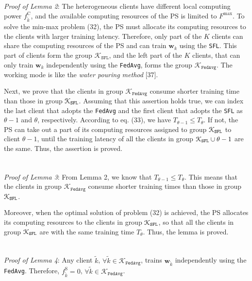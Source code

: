 \documentclass[10pt,journal,transmag]{IEEEtran}
\begin{document}
\begin{appendices}
\section{}
\label{appendix:proof of lemma 1}
\textit{Proof of Lemma 2}: The heterogeneous clients have different local computing power $f_{\tilde{k}}^\text{C}$, and the available computing resources of the PS is limited to $F^\text{max}$. To solve the min-max problem (32), the PS must allocate its computing resources to the clients with larger training latency. Therefore, only part of the $K$ clients can share the computing resources of the PS and can train $\textbf{w}_k$ using the \texttt{SFL}. This part of clients form the group $\mathcal{K}_\texttt{SFL}$, and the left part of the $K$ clients, that can only train $\textbf{w}_k$ independently using the \texttt{FedAvg}, forms the group $\mathcal{K}_\texttt{FedAvg}$. The working mode is like the \textit{water pouring method} [37].

Next, we prove that the clients in group $\mathcal{K}_\texttt{FedAvg}$ consume shorter training time than those in group $\mathcal{K}_\text{\texttt{SFL}}$. Assuming that this assertion holds true, we can index the last client that adopts the \texttt{FedAvg} and the first client that adopts the \texttt{SFL} as $\theta-1$ and $\theta$, respectively. According to eq. (33), we have $T_{\theta-1} \leqslant T_{\theta}$. If not, the PS can take out a part of its computing resources assigned to group $\mathcal{K}_\text{\texttt{SFL}}$ to client $\theta-1$, until the training latency of all the clients in group $\mathcal{K}_\text{\texttt{SFL}} \cup \theta-1$ are the same. Thus, the assertion is proved.

\section{}
\label{appendix:proof of lemma 2}
\textit{Proof of Lemma 3}: From Lemma 2, we know that $T_{\theta-1} \leqslant T_{\theta}$. This means that the clients in group $\mathcal{K}_\texttt{FedAvg}$ consume shorter training times than those in group $\mathcal{K}_\text{\texttt{SFL}}$.

Moreover, when the optimal solution of problem (32) is achieved, the PS allocates its computing resources to the clients in group $\mathcal{K}_\text{\texttt{SFL}}$, so that all the clients in group $\mathcal{K}_\text{\texttt{SFL}}$ are with the same training time $T_{\theta}$. Thus, the lemma is proved.

\section{}
\label{appendix:proof of optimal solution}
\textit{Proof of Lemma 4}: Any client $\tilde{k}$, $\forall \tilde{k} \in \mathcal{K}_{\texttt{FedAvg}}$,
trains $\textbf{w}_{\tilde{k}}$ independently using the \texttt{FedAvg}.
Therefore, $f^\text{S}_{\tilde{k}}=0$, $\forall \tilde{k} \in \mathcal{K}_{\texttt{FedAvg}}$.


\end{appendices}
\end{document}
